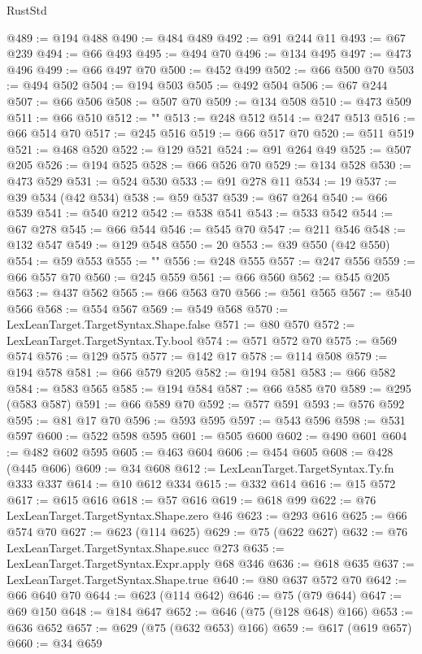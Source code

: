 \begin{lexlean}{RustStd}
\begin{coremodule}
{\begin{coremodule}
{{{{{{{{{{{{{{{{{{{{{{{{{{{{{{{{{{{{{{{{{{{@489 := @194 @488
@490 := @484 @489
@492 := @91 @244 @11
@493 := @67 @239
@494 := @66 @493
@495 := @494 @70
@496 := @134 @495
@497 := @473 @496
@499 := @66 @497 @70
@500 := @452 @499
@502 := @66 @500 @70
@503 := @494 @502
@504 := @194 @503
@505 := @492 @504
@506 := @67 @244
@507 := @66 @506
@508 := @507 @70
@509 := @134 @508
@510 := @473 @509
@511 := @66 @510
@512 := "{"
@513 := @248 @512
@514 := @247 @513
@516 := @66 @514 @70
@517 := @245 @516
@519 := @66 @517 @70
@520 := @511 @519
@521 := @468 @520
@522 := @129 @521
@524 := @91 @264 @49
@525 := @507 @205
@526 := @194 @525
@528 := @66 @526 @70
@529 := @134 @528
@530 := @473 @529
@531 := @524 @530
@533 := @91 @278 @11
@534 := 19
@537 := @39 @534 (@42 @534)
@538 := @59 @537
@539 := @67 @264
@540 := @66 @539
@541 := @540 @212
@542 := @538 @541
@543 := @533 @542
@544 := @67 @278
@545 := @66 @544
@546 := @545 @70
@547 := @211 @546
@548 := @132 @547
@549 := @129 @548
@550 := 20
@553 := @39 @550 (@42 @550)
@554 := @59 @553
@555 := "}"
@556 := @248 @555
@557 := @247 @556
@559 := @66 @557 @70
@560 := @245 @559
@561 := @66 @560
@562 := @545 @205
@563 := @437 @562
@565 := @66 @563 @70
@566 := @561 @565
@567 := @540 @566
@568 := @554 @567
@569 := @549 @568
@570 := LexLeanTarget.TargetSyntax.Shape.false
@571 := @80 @570
@572 := LexLeanTarget.TargetSyntax.Ty.bool
@574 := @571 @572 @70
@575 := @569 @574
@576 := @129 @575
@577 := @142 @17
@578 := @114 @508
@579 := @194 @578
@581 := @66 @579 @205
@582 := @194 @581
@583 := @66 @582
@584 := @583 @565
@585 := @194 @584
@587 := @66 @585 @70
@589 := @295 (@583 @587)
@591 := @66 @589 @70
@592 := @577 @591
@593 := @576 @592
@595 := @81 @17 @70
@596 := @593 @595
@597 := @543 @596
@598 := @531 @597
@600 := @522 @598 @595
@601 := @505 @600
@602 := @490 @601
@604 := @482 @602 @595
@605 := @463 @604
@606 := @454 @605
@608 := @428 (@445 @606)
@609 := @34 @608
@612 := LexLeanTarget.TargetSyntax.Ty.fn @333 @337
@614 := @10 @612 @334
@615 := @332 @614
@616 := @15 @572
@617 := @615 @616
@618 := @57 @616
@619 := @618 @99
@622 := @76 LexLeanTarget.TargetSyntax.Shape.zero @46
@623 := @293 @616
@625 := @66 @574 @70
@627 := @623 (@114 @625)
@629 := @75 (@622 @627)
@632 := @76 LexLeanTarget.TargetSyntax.Shape.succ @273
@635 := LexLeanTarget.TargetSyntax.Expr.apply @68 @346
@636 := @618 @635
@637 := LexLeanTarget.TargetSyntax.Shape.true
@640 := @80 @637 @572 @70
@642 := @66 @640 @70
@644 := @623 (@114 @642)
@646 := @75 (@79 @644)
@647 := @69 @150
@648 := @184 @647
@652 := @646 (@75 (@128 @648) @166)
@653 := @636 @652
@657 := @629 (@75 (@632 @653) @166)
@659 := @617 (@619 @657)
@660 := @34 @659
}}}}}}}}}}}}}}}}}}}}}}}}}}}}}}}}}}}}}}}}}}}
\end{coremodule}}
\end{coremodule}
\end{lexlean}
